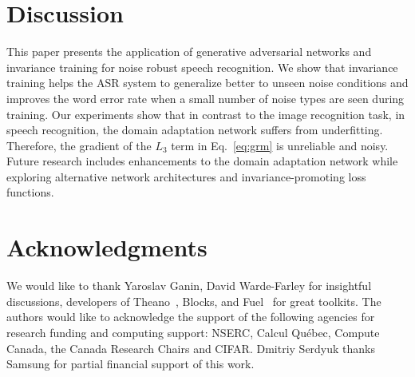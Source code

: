 \documentclass[a4paper]{article}
\begin{document}
\section{Discussion}
\label{sec:discussion}
    This paper presents the application of generative adversarial networks and 
    invariance training for noise robust speech recognition. We show that invariance training 
    helps the ASR system to generalize better to unseen noise conditions and improves 
    the word error rate when a small number of noise types are seen during training. Our 
    experiments show that in contrast to the image recognition task, in speech 
    recognition, the domain adaptation network suffers from underfitting. Therefore, the 
    gradient of the $L_3$ term in Eq.~\ref{eq:grm} is unreliable and noisy. Future 
    research includes enhancements to the domain adaptation network while exploring 
    alternative network architectures and invariance-promoting loss functions.

\section{Acknowledgments}

We would like to thank Yaroslav Ganin, David Warde-Farley for insightful discussions,
developers of Theano~\citep{theano2016theano}, Blocks, and Fuel~\citep{MerrienboerBDSW15} 
for great toolkits. 
The authors would like to acknowledge the support of the following agencies for
research funding and computing support: NSERC, Calcul Qu\'{e}bec, Compute Canada,
the Canada Research Chairs and CIFAR. Dmitriy Serdyuk thanks Samsung for partial
financial support of this work.




\end{document}
